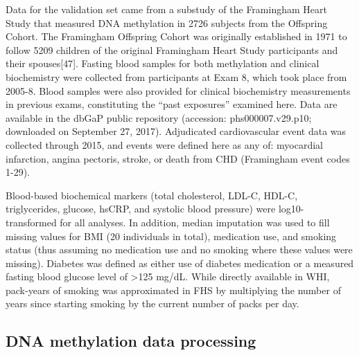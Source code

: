 \documentclass[]{article}
\theoremstyle{definition}
\theoremstyle{definition}
\theoremstyle{definition}
\theoremstyle{remark}
\begin{document}
Data for the validation set came from a substudy of the Framingham Heart
Study that measured DNA methylation in 2726 subjects from the Offspring
Cohort. The Framingham Offspring Cohort was originally established in
1971 to follow 5209 children of the original Framingham Heart Study
participants and their spouses{[}47{]}. Fasting blood samples for both
methylation and clinical biochemistry were collected from participants
at Exam 8, which took place from 2005-8. Blood samples were also
provided for clinical biochemistry measurements in previous exams,
constituting the ``past exposures'' examined here. Data are available in
the dbGaP public repository (accession: phs000007.v29.p10; downloaded on
September 27, 2017). Adjudicated cardiovascular event data was collected
through 2015, and events were defined here as any of: myocardial
infarction, angina pectoris, stroke, or death from CHD (Framingham event
codes 1-29).

Blood-based biochemical markers (total cholesterol, LDL-C, HDL-C,
triglycerides, glucose, hsCRP, and systolic blood pressure) were
log10-transformed for all analyses. In addition, median imputation was
used to fill missing values for BMI (20 individuals in total),
medication use, and smoking status (thus assuming no medication use and
no smoking where these values were missing). Diabetes was defined as
either use of diabetes medication or a measured fasting blood glucose
level of \textgreater{}125 mg/dL. While directly available in WHI,
pack-years of smoking was approximated in FHS by multiplying the number
of years since starting smoking by the current number of packs per day.

\subsection{DNA methylation data
processing}\label{dna-methylation-data-processing}
\end{document}
